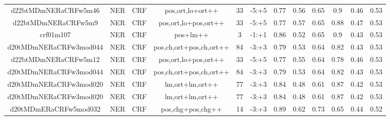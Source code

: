 \documentclass[a4paper]{article}
\begin{document}
\begin{landscape}
\begin{center}
\begin{tabular}{ |c|c|c|c|c|c|c|c|c|c|c|c|}
 	
 
 	
 		
 		\small{ d22btMDmNERaCRFw5m46 } & NER & CRF & pos,ort,lo+ort++  &  33 &  -5:+5  &  0.77 & 0.56 & 0.65  &  0.9 & 0.46 & 0.53 \\
 		

 	
 
 	
 		
 		\small{ d22btMDmNERaCRFw5m9 } & NER & CRF & pos,ort,lo+pos,ort++  &  33 &  -5:+5  &  0.77 & 0.57 & 0.65  &  0.88 & 0.47 & 0.53 \\
 		

 	
 
 	
 		
 		\small{ crf01m107 } & NER & CRF & pos+lm++  &  3 &  -1:+1  &  0.86 & 0.52 & 0.65  &  0.9 & 0.43 & 0.53 \\
 		

 	
 
 	
 		
 		\small{ d20tMDmNERaCRFw3mod044 } & NER & CRF & pos,ch,ort+pos,ch,ort++  &  84 &  -3:+3  &  0.79 & 0.53 & 0.64  &  0.82 & 0.43 & 0.53 \\
 		

 	
 
 	
 		
 		\small{ d22btMDmNERaCRFw5m12 } & NER & CRF & pos,ort,lo+pos,ort++  &  33 &  -5:+5  &  0.77 & 0.55 & 0.64  &  0.78 & 0.46 & 0.53 \\
 		

 	
 
 	
 		
 		\small{ d20tMDmNERaCRFw3mod044 } & NER & CRF & pos,ch,ort+pos,ch,ort++  &  84 &  -3:+3  &  0.79 & 0.53 & 0.64  &  0.82 & 0.43 & 0.53 \\
 		

 	
 
 	
 		
 		\small{ d20tMDmNERaCRFw3mod020 } & NER & CRF & lm,ort+lm,ort++  &  77 &  -3:+3  &  0.84 & 0.48 & 0.61  &  0.87 & 0.42 & 0.53 \\
 		

 	
 
 	
 		
 		\small{ d20tMDmNERaCRFw3mod020 } & NER & CRF & lm,ort+lm,ort++  &  77 &  -3:+3  &  0.84 & 0.48 & 0.61  &  0.87 & 0.42 & 0.53 \\
 		

 	
 
 	
 		
 		\small{ d20tMDmERaCRFw5mod032 } & NER & CRF & pos,chg+pos,chg++  &  14 &  -3:+3  &  0.89 & 0.62 & 0.73  &  0.65 & 0.44 & 0.52 \\
 		


\end{tabular}
\end{center}
\end{landscape}
\end{document}
